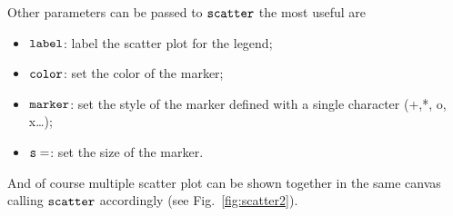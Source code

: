 Other parameters can be passed to \(\tt{scatter}\) the most useful are

\begin{itemize}
	\tightlist
	\item
	\(\tt{label}\): label the scatter plot for the legend;
	\item
	\(\tt{color}\): set the color of the marker;
	\item
	\(\tt{marker}\): set the style of the marker defined with a single
	character (+,*, o, x\ldots{});
	\item
	\(\tt{s=}\): set the size of the marker.
\end{itemize}

And of course multiple scatter plot can be shown together in the same
canvas calling \(\tt{scatter}\) accordingly (see Fig.~\ref{fig:scatter2}).

